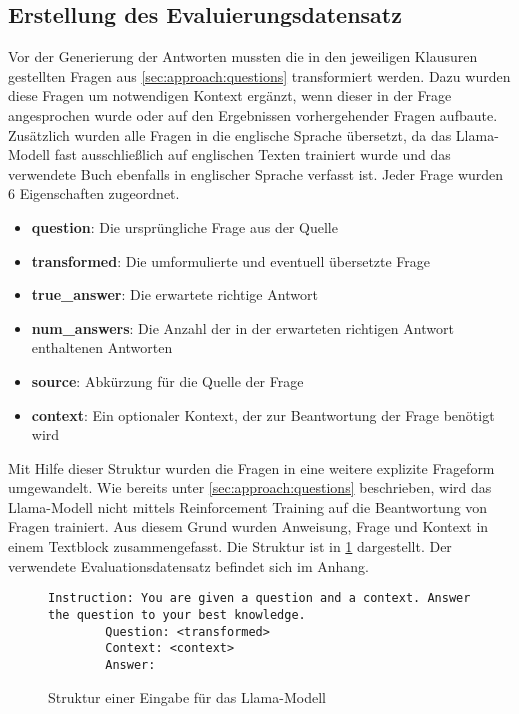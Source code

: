 \subsection{Erstellung des Evaluierungsdatensatz}\label{subsec:eval-dataset}
Vor der Generierung der Antworten mussten die in den jeweiligen Klausuren gestellten Fragen aus \cref{sec:approach:questions} transformiert werden.
Dazu wurden diese Fragen um notwendigen Kontext ergänzt, wenn dieser in der Frage angesprochen wurde oder auf den Ergebnissen vorhergehender Fragen aufbaute.
Zusätzlich wurden alle Fragen in die englische Sprache übersetzt, da das Llama-Modell fast ausschließlich auf englischen Texten trainiert wurde und das verwendete Buch \citet{bb} ebenfalls in englischer Sprache verfasst ist.
Jeder Frage wurden 6 Eigenschaften zugeordnet.
\begin{itemize}
    \item \textbf{question}: Die ursprüngliche Frage aus der Quelle
    \item \textbf{transformed}: Die umformulierte und eventuell übersetzte Frage
    \item \textbf{true\_answer}: Die erwartete richtige Antwort
    \item \textbf{num\_answers}: Die Anzahl der in der erwarteten richtigen Antwort enthaltenen Antworten
    \item \textbf{source}: Abkürzung für die Quelle der Frage
    \item \textbf{context}: Ein optionaler Kontext, der zur Beantwortung der Frage benötigt wird
\end{itemize}

Mit Hilfe dieser Struktur wurden die Fragen in eine weitere explizite Frageform umgewandelt.
Wie bereits unter \cref{sec:approach:questions} beschrieben, wird das Llama-Modell nicht mittels Reinforcement Training auf die Beantwortung von Fragen trainiert.
Aus diesem Grund wurden Anweisung, Frage und Kontext in einem Textblock zusammengefasst.
Die Struktur ist in \cref{fig:llama-input} dargestellt.
Der verwendete Evaluationsdatensatz befindet sich im Anhang.\\

\begin{figure}

    \begin{lstlisting}[linewidth=13cm]
        Instruction: You are given a question and a context. Answer the question to your best knowledge.
        Question: <transformed>
        Context: <context>
        Answer:
    \end{lstlisting}
    \caption{Struktur einer Eingabe für das Llama-Modell}\label{fig:llama-input}
\end{figure}

